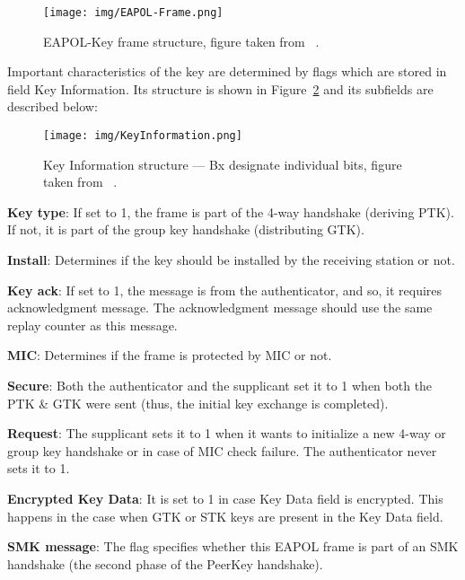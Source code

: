 \begin{figure}[h!]
  \centering
  \texttt{[image: img/EAPOL-Frame.png]}
  \caption[EAPOL-Key frame structure]{EAPOL-Key frame structure, figure taken from ~\cite{revision2016}.}
  \label{fig:EAPOLKey}
\end{figure}

Important characteristics of the key are determined by flags which are stored in field Key Information. Its structure is shown in Figure~\ref{fig:KeyInformation} and its subfields are described below:

\begin{figure}[h!]
  \centering
  \texttt{[image: img/KeyInformation.png]}
  \caption[Key Information structure]{Key Information structure --- Bx designate individual bits, figure taken from ~\cite{revision2016}.}
  \label{fig:KeyInformation}
\end{figure}

\begin{description}
\item \textbf{Key type}: If set to 1, the frame is part of the 4-way handshake (deriving PTK). If not, it is part of the group key handshake (distributing GTK).
\item \textbf{Install}: Determines if the key should be installed by the receiving station or not.
\item \textbf{Key ack}: If set to 1, the message is from the authenticator, and so, it requires acknowledgment message. The acknowledgment message should use the same replay counter as this message.
\item \textbf{MIC}: Determines if the frame is protected by MIC or not. 
\item \textbf{Secure}: Both the authenticator and the supplicant set it to 1 when both the PTK \& GTK were sent (thus, the initial key exchange is completed).
\item \textbf{Request}: The supplicant sets it to 1 when it wants to initialize a new 4-way or group key handshake or in case of MIC check failure. The authenticator never sets it to 1.
\item \textbf{Encrypted Key Data}: It is set to 1 in case Key Data field is encrypted. This happens in the case when GTK or STK keys are present in the Key Data field.
\item \textbf{SMK message}: The flag specifies whether this EAPOL frame is part of an SMK handshake (the second phase of the PeerKey handshake).
\end{description}


